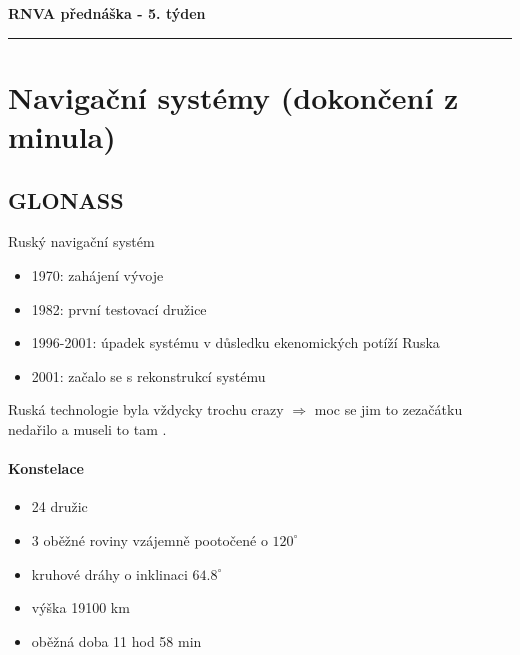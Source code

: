 \documentclass[11pt,a4paper]{article}
\theoremstyle{my-theorem}
\theoremstyle{non-theorem}
\begin{document}

\noindent\LARGE\textbf{RNVA přednáška - 5. týden}\normalsize\\
\noindent\rule{14.5cm}{0.4pt}

\section{Navigační systémy (dokončení z minula)}

\subsection{GLONASS}
Ruský navigační systém
\begin{itemize}
    \item 1970: zahájení vývoje
    \item 1982: první testovací družice
    \item 1996-2001: úpadek systému v důsledku ekenomických potíží Ruska
    \item 2001: začalo se s rekonstrukcí systému
\end{itemize}
Ruská technologie byla vždycky trochu crazy $\Rightarrow$ moc se jim to zezačátku nedařilo a museli to tam .

\paragraph*{Konstelace}
\begin{itemize}
    \item 24 družic
    \item 3 oběžné roviny vzájemně pootočené o $120^\circ$
    \item kruhové dráhy o inklinaci $64.8^\circ$
    \item výška 19100 km
    \item oběžná doba 11 hod 58 min
\end{itemize}
\end{document}
